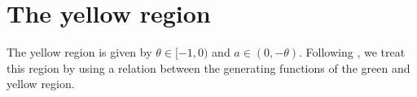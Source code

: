 \documentclass[12pt]{article}
\newcommand{\R}{\mathbb{R}} %
\newcommand{\1}{\mathds{1}}
\theoremstyle{definition}
\theoremstyle{plain}
\newtheorem{Lemma}[definition]{Lemma}
\theoremstyle{remark}
\begin{document}
\section{The yellow region}
The yellow region is given by $\theta\in[-1,0)$ and $a\in(0,-\theta)$. Following \cite{AurzadaRaschel}, we treat this region by using a relation between the generating functions of the green and yellow region. 
\end{document}

